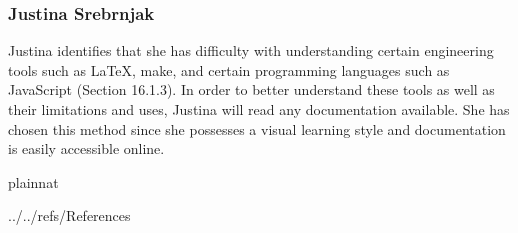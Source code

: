 \documentclass[12pt]{article}
\begin{document}
\subsubsection{Justina Srebrnjak}
Justina identifies that she has difficulty with understanding certain engineering tools such as \LaTeX, make, and certain programming languages such as JavaScript (Section 16.1.3). In order to better understand these tools as well as their limitations and uses, Justina will read any documentation available. She has chosen this method since she possesses a visual learning style and documentation is easily accessible online.

 {plainnat}

 {../../refs/References}
\end{document}
